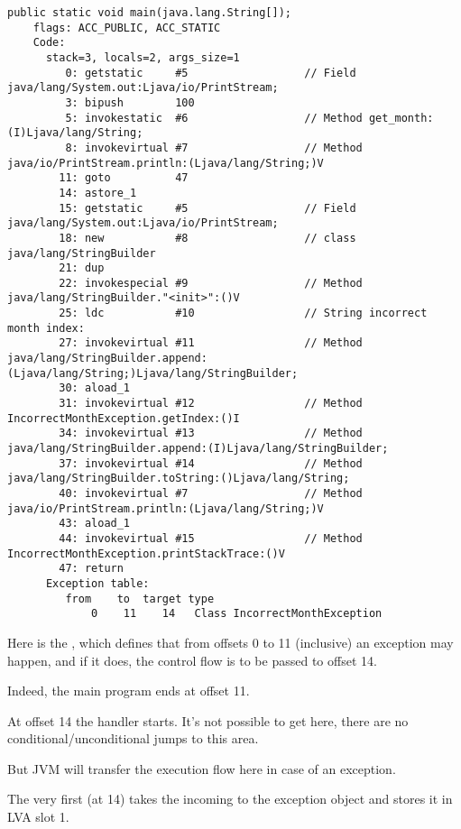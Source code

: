 \begin{lstlisting}[caption=Month2.class]
  public static void main(java.lang.String[]);
    flags: ACC_PUBLIC, ACC_STATIC
    Code:
      stack=3, locals=2, args_size=1
         0: getstatic     #5                  // Field java/lang/System.out:Ljava/io/PrintStream;
         3: bipush        100
         5: invokestatic  #6                  // Method get_month:(I)Ljava/lang/String;
         8: invokevirtual #7                  // Method java/io/PrintStream.println:(Ljava/lang/String;)V
        11: goto          47
        14: astore_1      
        15: getstatic     #5                  // Field java/lang/System.out:Ljava/io/PrintStream;
        18: new           #8                  // class java/lang/StringBuilder
        21: dup           
        22: invokespecial #9                  // Method java/lang/StringBuilder."<init>":()V
        25: ldc           #10                 // String incorrect month index: 
        27: invokevirtual #11                 // Method java/lang/StringBuilder.append:(Ljava/lang/String;)Ljava/lang/StringBuilder;
        30: aload_1       
        31: invokevirtual #12                 // Method IncorrectMonthException.getIndex:()I
        34: invokevirtual #13                 // Method java/lang/StringBuilder.append:(I)Ljava/lang/StringBuilder;
        37: invokevirtual #14                 // Method java/lang/StringBuilder.toString:()Ljava/lang/String;
        40: invokevirtual #7                  // Method java/io/PrintStream.println:(Ljava/lang/String;)V
        43: aload_1       
        44: invokevirtual #15                 // Method IncorrectMonthException.printStackTrace:()V
        47: return        
      Exception table:
         from    to  target type
             0    11    14   Class IncorrectMonthException
\end{lstlisting}

Here is the , which defines that from offsets 0 to 11 (inclusive) an exception 
 may happen, and if it does, the control flow is to be passed to offset 14.

Indeed, the main program ends at offset 11.

At offset 14 the handler starts. It's not possible to get here, 
there are no conditional/unconditional jumps to this area.

But \ac{JVM} will transfer the execution flow here in case of an exception.

The very first  (at 14) takes the incoming  to the exception object 
and stores it in \ac{LVA} slot 1.

